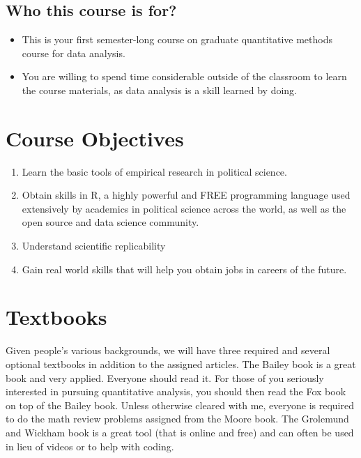 \documentclass[11pt,]{article}
\begin{document}
\subsection{Who this course is for?}\label{who-this-course-is-for}

\begin{itemize}
\item
  This is your first semester-long course on graduate quantitative
  methods course for data analysis.
\item
  You are willing to spend time considerable outside of the classroom to
  learn the course materials, as data analysis is a skill learned by
  doing.
\end{itemize}

\section{Course Objectives}\label{course-objectives}

\begin{enumerate}
\def\labelenumi{\arabic{enumi}.}
\item
  Learn the basic tools of empirical research in political science.
\item
  Obtain skills in R, a highly powerful and FREE programming language
  used extensively by academics in political science across the world,
  as well as the open source and data science community.
\item
  Understand scientific replicability
\item
  Gain real world skills that will help you obtain jobs in careers of
  the future.
\end{enumerate}

\section{Textbooks}\label{textbooks}

Given people's various backgrounds, we will have three required and
several optional textbooks in addition to the assigned articles. The
Bailey book is a great book and very applied. Everyone should read it.
For those of you seriously interested in pursuing quantitative analysis,
you should then read the Fox book on top of the Bailey book. Unless
otherwise cleared with me, everyone is required to do the math review
problems assigned from the Moore book. The Grolemund and Wickham book is
a great tool (that is online and free) and can often be used in lieu of
videos or to help with coding.
\end{document}
